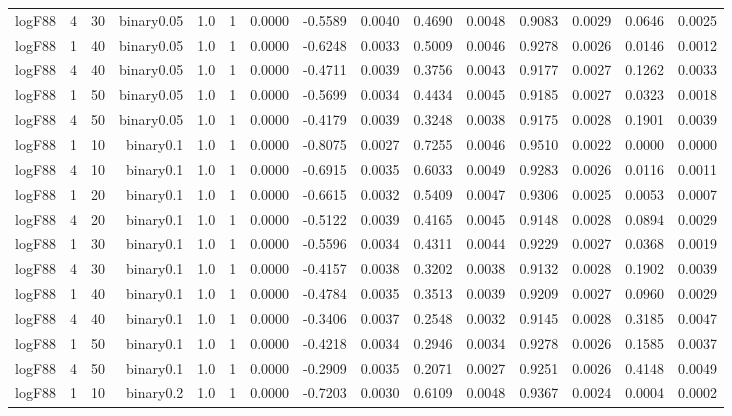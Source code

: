 \begin{longtable}{rrrrrrrrrrrrrrr}
  logF88 & 4 & 30 & binary0.05 & 1.0 & 1 & 0.0000 & -0.5589 & 0.0040 & 0.4690 & 0.0048 & 0.9083 & 0.0029 & 0.0646 & 0.0025 \\ 
  logF88 & 1 & 40 & binary0.05 & 1.0 & 1 & 0.0000 & -0.6248 & 0.0033 & 0.5009 & 0.0046 & 0.9278 & 0.0026 & 0.0146 & 0.0012 \\ 
  logF88 & 4 & 40 & binary0.05 & 1.0 & 1 & 0.0000 & -0.4711 & 0.0039 & 0.3756 & 0.0043 & 0.9177 & 0.0027 & 0.1262 & 0.0033 \\ 
  logF88 & 1 & 50 & binary0.05 & 1.0 & 1 & 0.0000 & -0.5699 & 0.0034 & 0.4434 & 0.0045 & 0.9185 & 0.0027 & 0.0323 & 0.0018 \\ 
  logF88 & 4 & 50 & binary0.05 & 1.0 & 1 & 0.0000 & -0.4179 & 0.0039 & 0.3248 & 0.0038 & 0.9175 & 0.0028 & 0.1901 & 0.0039 \\ 
  logF88 & 1 & 10 & binary0.1 & 1.0 & 1 & 0.0000 & -0.8075 & 0.0027 & 0.7255 & 0.0046 & 0.9510 & 0.0022 & 0.0000 & 0.0000 \\ 
  logF88 & 4 & 10 & binary0.1 & 1.0 & 1 & 0.0000 & -0.6915 & 0.0035 & 0.6033 & 0.0049 & 0.9283 & 0.0026 & 0.0116 & 0.0011 \\ 
  logF88 & 1 & 20 & binary0.1 & 1.0 & 1 & 0.0000 & -0.6615 & 0.0032 & 0.5409 & 0.0047 & 0.9306 & 0.0025 & 0.0053 & 0.0007 \\ 
  logF88 & 4 & 20 & binary0.1 & 1.0 & 1 & 0.0000 & -0.5122 & 0.0039 & 0.4165 & 0.0045 & 0.9148 & 0.0028 & 0.0894 & 0.0029 \\ 
  logF88 & 1 & 30 & binary0.1 & 1.0 & 1 & 0.0000 & -0.5596 & 0.0034 & 0.4311 & 0.0044 & 0.9229 & 0.0027 & 0.0368 & 0.0019 \\ 
  logF88 & 4 & 30 & binary0.1 & 1.0 & 1 & 0.0000 & -0.4157 & 0.0038 & 0.3202 & 0.0038 & 0.9132 & 0.0028 & 0.1902 & 0.0039 \\ 
  logF88 & 1 & 40 & binary0.1 & 1.0 & 1 & 0.0000 & -0.4784 & 0.0035 & 0.3513 & 0.0039 & 0.9209 & 0.0027 & 0.0960 & 0.0029 \\ 
  logF88 & 4 & 40 & binary0.1 & 1.0 & 1 & 0.0000 & -0.3406 & 0.0037 & 0.2548 & 0.0032 & 0.9145 & 0.0028 & 0.3185 & 0.0047 \\ 
  logF88 & 1 & 50 & binary0.1 & 1.0 & 1 & 0.0000 & -0.4218 & 0.0034 & 0.2946 & 0.0034 & 0.9278 & 0.0026 & 0.1585 & 0.0037 \\ 
  logF88 & 4 & 50 & binary0.1 & 1.0 & 1 & 0.0000 & -0.2909 & 0.0035 & 0.2071 & 0.0027 & 0.9251 & 0.0026 & 0.4148 & 0.0049 \\ 
  logF88 & 1 & 10 & binary0.2 & 1.0 & 1 & 0.0000 & -0.7203 & 0.0030 & 0.6109 & 0.0048 & 0.9367 & 0.0024 & 0.0004 & 0.0002 \\ 

\end{longtable}
